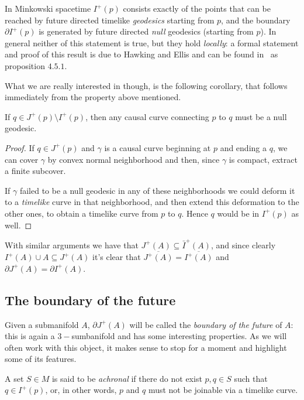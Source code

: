 In Minkowski spacetime \(I^+(p)\) consists exactly of the points that can be reached by future directed timelike \emph{geodesics} starting from \(p\), and the boundary \(\partial I^+(p)\) is generated by future directed \emph{null} geodesics (starting from \(p\)). In general neither of this statement is true, but they hold \emph{locally}: a formal statement and proof of this result is due to Hawking and Ellis and can be found in~\cite{hawking1973large} as proposition \(4.5.1\).

What we are really interested in though, is the following corollary, that follows immediately from the property above mentioned.
\begin{corollary}
	If \(q \in J^+(p) \setminus I^+(p)\), then any causal curve connecting \(p\) to \(q\) must be a null geodesic.
\end{corollary}

\begin{proof}
	If \( q \in J^+(p)\) and \(\gamma\) is a causal curve beginning at \(p\) and ending a \(q\), we can cover \(\gamma\) by convex normal neighborhood and then, since \(\gamma\) is compact, extract a finite subcover.
	
	If \(\gamma\) failed to be a null geodesic in any of these neighborhoods we could deform it to a \emph{timelike} curve in that neighborhood, and then extend this deformation to the other ones, to obtain a timelike curve from \(p\) to \(q\). Hence \(q\) would be in \(I^+(p)\) as well.
\end{proof}

With similar arguments we have that \(J^+(A) \subseteq \bar{I}^+(A)\), and since clearly \(I^+(A) \cup A \subseteq J^+(A)\) it's clear that \(\overline{J^+(A)} = \overline{I^+(A)}\) and \(\partial J^+(A) = \partial I^+(A)\).

\subsection{The boundary of the future}
Given a submanifold \(A\), \(\partial J^+(A)\) will be called the \emph{boundary of the future} of \(A\): this is again a \(3-\)sumbanifold and has some interesting properties. As we will often work with this object, it makes sense to stop for a moment and highlight some of its features.

\begin{definition}
	A set \(S\in M\) is said to be \emph{achronal} if there do not exist \(p, q \in S\) such that \(q\in I^+(p)\), or, in other words, \(p\) and \(q\) must not be joinable via a timelike curve. 
\end{definition}

